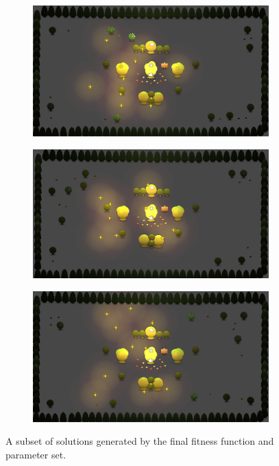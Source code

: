 \begin{figure}[h]
\begin{subfigure}[b]{0.48\linewidth}
                \caption{}
                \label{fig:ga_outcome_3}
        \end{subfigure}
        \begin{subfigure}[b]{0.48\linewidth}
                \includegraphics[width=\linewidth]{./ga_outcome_4}
                \caption{}
                \label{fig:ga_outcome_4}
        \end{subfigure}
        \begin{subfigure}[b]{0.48\linewidth}
                \includegraphics[width=\linewidth]{./ga_outcome_5}
                \caption{}
                \label{fig:ga_outcome_5}
        \end{subfigure}
        \begin{subfigure}[b]{0.48\linewidth}
                \includegraphics[width=\linewidth]{./ga_outcome_6}
                \caption{}
                \label{fig:ga_outcome_6}
        \end{subfigure}
        \caption{A subset of solutions generated by the final fitness function and parameter set.}
        \label{fig:GA_Final}
\end{figure}